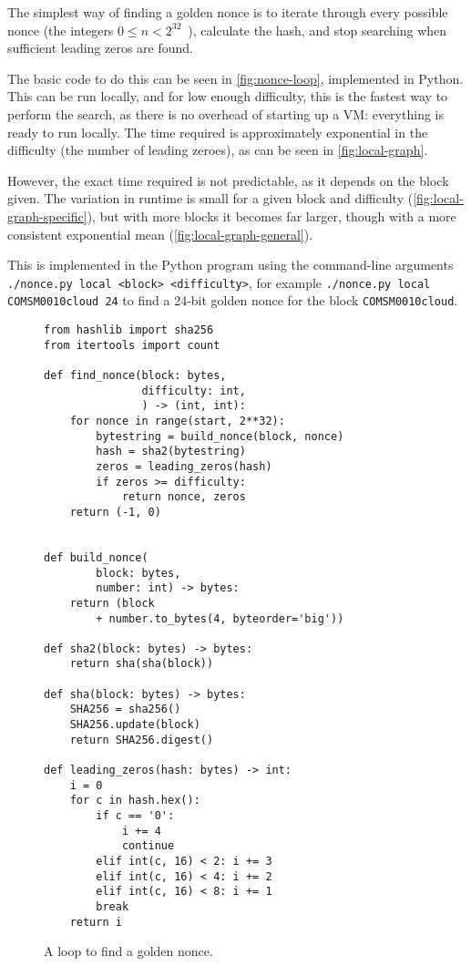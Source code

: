 \documentclass[letterpaper,twocolumn,11pt]{article}
\begin{document}
The simplest way of finding a golden nonce is to iterate through every possible nonce (the integers $0\leq n< 2^{32}$~\cite{cw1}), calculate the hash, and stop searching when sufficient leading zeros are found.

The basic code to do this can be seen in \autoref{fig:nonce-loop}, implemented in Python. This can be run locally, and for low enough difficulty, this is the fastest way to perform the search, as there is no overhead of starting up a VM: everything is ready to run locally. The time required is approximately exponential in the difficulty (the number of leading zeroes), as can be seen in \autoref{fig:local-graph}.

However, the exact time required is not predictable, as it depends on the block given. The variation in runtime is small for a given block and difficulty (\autoref{fig:local-graph-specific}), but with more blocks it becomes far larger, though with a more consistent exponential mean (\autoref{fig:local-graph-general}).

This is implemented in the Python program using the command-line arguments \texttt{./nonce.py local <block> <difficulty>}, for example \verb|./nonce.py local COMSM0010cloud 24| to find a 24-bit golden nonce for the block \texttt{COMSM0010cloud}.

\begin{figure}
\begin{verbatim}
from hashlib import sha256
from itertools import count

def find_nonce(block: bytes,
               difficulty: int,
               ) -> (int, int):
    for nonce in range(start, 2**32):
        bytestring = build_nonce(block, nonce)
        hash = sha2(bytestring)
        zeros = leading_zeros(hash)
        if zeros >= difficulty:
            return nonce, zeros
    return (-1, 0)


def build_nonce(
        block: bytes,
        number: int) -> bytes:
    return (block
        + number.to_bytes(4, byteorder='big'))

def sha2(block: bytes) -> bytes:
    return sha(sha(block))

def sha(block: bytes) -> bytes:
    SHA256 = sha256()
    SHA256.update(block)
    return SHA256.digest()

def leading_zeros(hash: bytes) -> int:
    i = 0
    for c in hash.hex():
        if c == '0':
            i += 4
            continue
        elif int(c, 16) < 2: i += 3
        elif int(c, 16) < 4: i += 2
        elif int(c, 16) < 8: i += 1
        break
    return i
\end{verbatim}
\caption{A loop to find a golden nonce.}
\label{fig:nonce-loop}
\end{figure}
\end{document}
